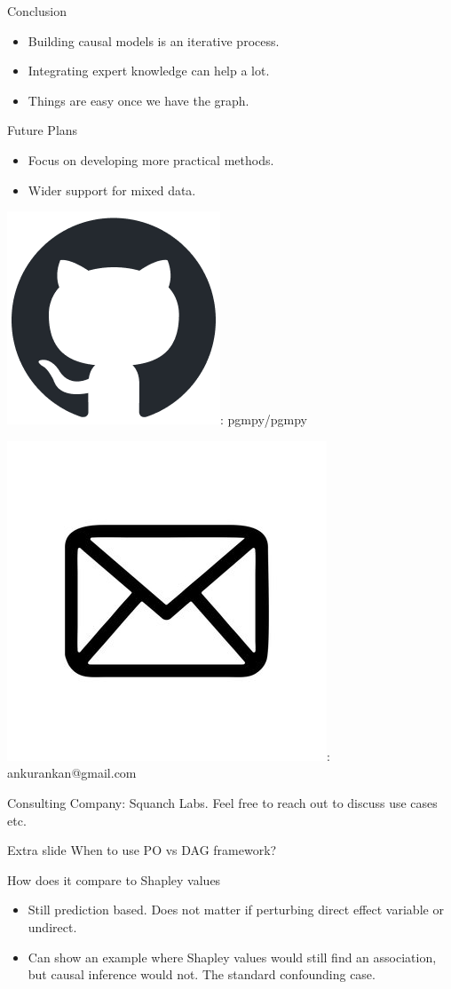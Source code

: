 \documentclass{beamer}
\newcommand\github{\includegraphics[height=3ex]{imgs/github.png}}
\newcommand\email{\includegraphics[height=3ex]{imgs/email.png}}
\begin{document}
\begin{frame}{Conclusion}
	\begin{itemize}
		\item Building causal models is an iterative process.
		\item Integrating expert knowledge can help a lot.
		\item Things are easy once we have the graph.
	\end{itemize}
\end{frame}

\begin{frame}{Future Plans}
	\begin{itemize}
		\item Focus on developing more practical methods.
		\item Wider support for mixed data.
	\end{itemize}
\end{frame}

\begin{frame}
	\vspace{5em}

	\github: pgmpy/pgmpy

	\email: ankurankan@gmail.com

	Consulting Company: Squanch Labs. Feel free to reach out to discuss use cases etc.
\end{frame}

\begin{frame}{Extra slide}
	When to use PO vs DAG framework?
\end{frame}

\begin{frame}
	How does it compare to Shapley values 
	\begin{itemize}
		\item Still prediction based. Does not matter if perturbing direct effect variable or undirect.
		\item Can show an example where Shapley values would still find an association, but causal inference would not. The standard confounding case.
	\end{itemize}
\end{frame}
\end{document}
